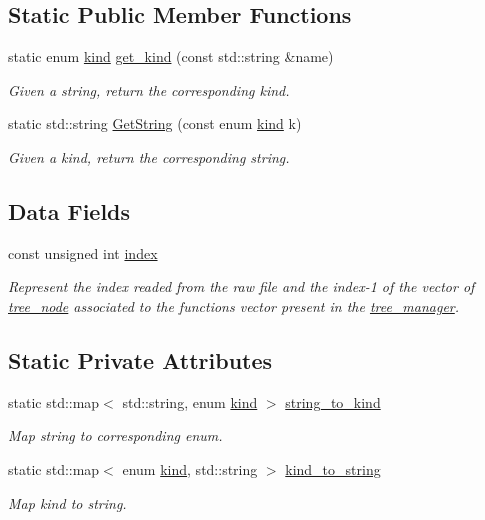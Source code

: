 \subsection*{Static Public Member Functions}
\begin{DoxyCompactItemize}
\item 
static enum \hyperlink{tree__common_8hpp_a9efbd7c7191fb190b76c2fd05d6e7b45}{kind} \hyperlink{classtree__node_a3f68e5e4337d81e0733d231844d71a52}{get\+\_\+kind} (const std\+::string \&name)
\begin{DoxyCompactList}\small\item\em Given a string, return the corresponding kind. \end{DoxyCompactList}\item 
static std\+::string \hyperlink{classtree__node_aae10f58d0f97a3e0ac02a188eb4ca1f8}{Get\+String} (const enum \hyperlink{tree__common_8hpp_a9efbd7c7191fb190b76c2fd05d6e7b45}{kind} k)
\begin{DoxyCompactList}\small\item\em Given a kind, return the corresponding string. \end{DoxyCompactList}\end{DoxyCompactItemize}
\subsection*{Data Fields}
\begin{DoxyCompactItemize}
\item 
const unsigned int \hyperlink{classtree__node_ac036ae7a6a4594d3052b9a29045464ca}{index}
\begin{DoxyCompactList}\small\item\em Represent the index readed from the raw file and the index-\/1 of the vector of \hyperlink{classtree__node}{tree\+\_\+node} associated to the functions vector present in the \hyperlink{classtree__manager}{tree\+\_\+manager}. \end{DoxyCompactList}\end{DoxyCompactItemize}
\subsection*{Static Private Attributes}
\begin{DoxyCompactItemize}
\item 
static std\+::map$<$ std\+::string, enum \hyperlink{tree__common_8hpp_a9efbd7c7191fb190b76c2fd05d6e7b45}{kind} $>$ \hyperlink{classtree__node_a7e8912d45db001a06ab7825ea3dc62c6}{string\+\_\+to\+\_\+kind}
\begin{DoxyCompactList}\small\item\em Map string to corresponding enum. \end{DoxyCompactList}\item 
static std\+::map$<$ enum \hyperlink{tree__common_8hpp_a9efbd7c7191fb190b76c2fd05d6e7b45}{kind}, std\+::string $>$ \hyperlink{classtree__node_a4acb8eaa2d77287880caa24020d639fe}{kind\+\_\+to\+\_\+string}
\begin{DoxyCompactList}\small\item\em Map kind to string. \end{DoxyCompactList}\end{DoxyCompactItemize}
